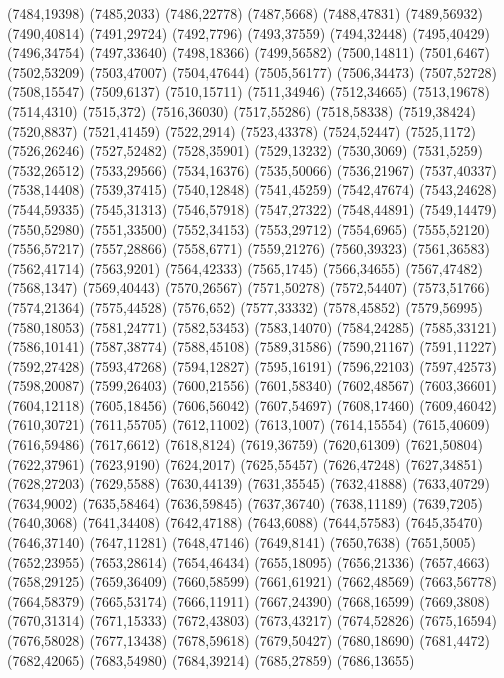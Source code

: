 (7484,19398)
(7485,2033)
(7486,22778)
(7487,5668)
(7488,47831)
(7489,56932)
(7490,40814)
(7491,29724)
(7492,7796)
(7493,37559)
(7494,32448)
(7495,40429)
(7496,34754)
(7497,33640)
(7498,18366)
(7499,56582)
(7500,14811)
(7501,6467)
(7502,53209)
(7503,47007)
(7504,47644)
(7505,56177)
(7506,34473)
(7507,52728)
(7508,15547)
(7509,6137)
(7510,15711)
(7511,34946)
(7512,34665)
(7513,19678)
(7514,4310)
(7515,372)
(7516,36030)
(7517,55286)
(7518,58338)
(7519,38424)
(7520,8837)
(7521,41459)
(7522,2914)
(7523,43378)
(7524,52447)
(7525,1172)
(7526,26246)
(7527,52482)
(7528,35901)
(7529,13232)
(7530,3069)
(7531,5259)
(7532,26512)
(7533,29566)
(7534,16376)
(7535,50066)
(7536,21967)
(7537,40337)
(7538,14408)
(7539,37415)
(7540,12848)
(7541,45259)
(7542,47674)
(7543,24628)
(7544,59335)
(7545,31313)
(7546,57918)
(7547,27322)
(7548,44891)
(7549,14479)
(7550,52980)
(7551,33500)
(7552,34153)
(7553,29712)
(7554,6965)
(7555,52120)
(7556,57217)
(7557,28866)
(7558,6771)
(7559,21276)
(7560,39323)
(7561,36583)
(7562,41714)
(7563,9201)
(7564,42333)
(7565,1745)
(7566,34655)
(7567,47482)
(7568,1347)
(7569,40443)
(7570,26567)
(7571,50278)
(7572,54407)
(7573,51766)
(7574,21364)
(7575,44528)
(7576,652)
(7577,33332)
(7578,45852)
(7579,56995)
(7580,18053)
(7581,24771)
(7582,53453)
(7583,14070)
(7584,24285)
(7585,33121)
(7586,10141)
(7587,38774)
(7588,45108)
(7589,31586)
(7590,21167)
(7591,11227)
(7592,27428)
(7593,47268)
(7594,12827)
(7595,16191)
(7596,22103)
(7597,42573)
(7598,20087)
(7599,26403)
(7600,21556)
(7601,58340)
(7602,48567)
(7603,36601)
(7604,12118)
(7605,18456)
(7606,56042)
(7607,54697)
(7608,17460)
(7609,46042)
(7610,30721)
(7611,55705)
(7612,11002)
(7613,1007)
(7614,15554)
(7615,40609)
(7616,59486)
(7617,6612)
(7618,8124)
(7619,36759)
(7620,61309)
(7621,50804)
(7622,37961)
(7623,9190)
(7624,2017)
(7625,55457)
(7626,47248)
(7627,34851)
(7628,27203)
(7629,5588)
(7630,44139)
(7631,35545)
(7632,41888)
(7633,40729)
(7634,9002)
(7635,58464)
(7636,59845)
(7637,36740)
(7638,11189)
(7639,7205)
(7640,3068)
(7641,34408)
(7642,47188)
(7643,6088)
(7644,57583)
(7645,35470)
(7646,37140)
(7647,11281)
(7648,47146)
(7649,8141)
(7650,7638)
(7651,5005)
(7652,23955)
(7653,28614)
(7654,46434)
(7655,18095)
(7656,21336)
(7657,4663)
(7658,29125)
(7659,36409)
(7660,58599)
(7661,61921)
(7662,48569)
(7663,56778)
(7664,58379)
(7665,53174)
(7666,11911)
(7667,24390)
(7668,16599)
(7669,3808)
(7670,31314)
(7671,15333)
(7672,43803)
(7673,43217)
(7674,52826)
(7675,16594)
(7676,58028)
(7677,13438)
(7678,59618)
(7679,50427)
(7680,18690)
(7681,4472)
(7682,42065)
(7683,54980)
(7684,39214)
(7685,27859)
(7686,13655)
